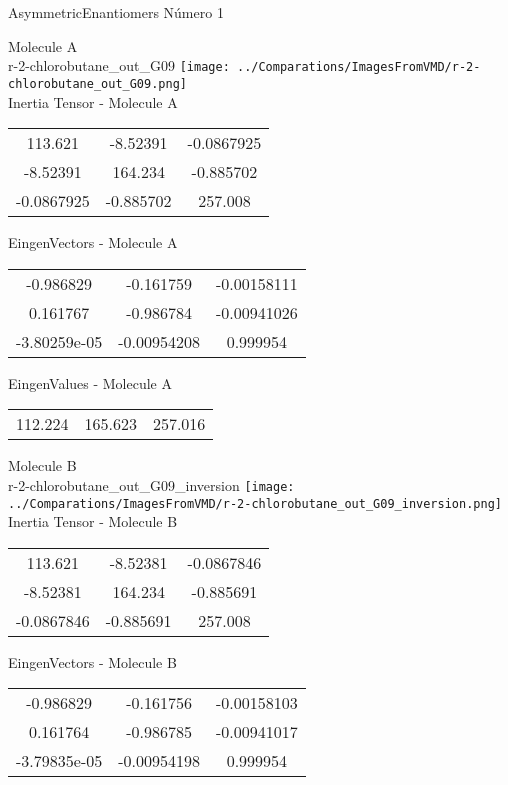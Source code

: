 
\vtab[-2cm]
\begin{center}
{\large AsymmetricEnantiomers \tab Número 1}
\end{center}
\begin{multicols}{2}
\begin{center}

Molecule A \\ 
r-2-chlorobutane\_out\_G09
\texttt{[image: ../Comparations/ImagesFromVMD/r-2-chlorobutane\_out\_G09.png]}
\\
Inertia Tensor - Molecule A \\
\vtab

\begin{tabular}{|c c c|}
113.621	 & 	-8.52391	 & 	-0.0867925	 \\
-8.52391	 & 	164.234	 & 	-0.885702	 \\
-0.0867925	 & 	-0.885702	 & 	257.008
\end{tabular}

\vtab
 EingenVectors - Molecule A     \\
\vtab
\begin{tabular}{|c c c|}
-0.986829	 & 	-0.161759	 & 	-0.00158111	 \\
0.161767	 & 	-0.986784	 & 	-0.00941026	 \\
-3.80259e-05	 & 	-0.00954208	 & 	0.999954
\end{tabular}

\vtab
 EingenValues - Molecule A     \\
\vtab
\begin{tabular}{|c c c|}
112.224	 & 	165.623	 & 	257.016	 \\
\end{tabular}
\columnbreak

Molecule B \\ 
r-2-chlorobutane\_out\_G09\_inversion
\texttt{[image: ../Comparations/ImagesFromVMD/r-2-chlorobutane\_out\_G09\_inversion.png]}
\\
Inertia Tensor - Molecule B \\
\vtab

\begin{tabular}{|c c c|}
113.621	 & 	-8.52381	 & 	-0.0867846	 \\
-8.52381	 & 	164.234	 & 	-0.885691	 \\
-0.0867846	 & 	-0.885691	 & 	257.008
\end{tabular}

\vtab
 EingenVectors - Molecule B     \\
\vtab
\begin{tabular}{|c c c|}
-0.986829	 & 	-0.161756	 & 	-0.00158103	 \\
0.161764	 & 	-0.986785	 & 	-0.00941017	 \\
-3.79835e-05	 & 	-0.00954198	 & 	0.999954
\end{tabular}


\end{center}
\end{multicols}
